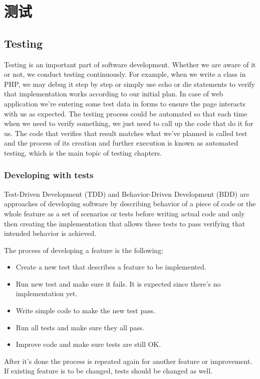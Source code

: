 \chapter{测试}
\label{test-overview.md}\section{Testing}
Testing is an important part of software development. Whether we are aware of it or not, we conduct testing continuously.
For example, when we write a class in PHP, we may debug it step by step or simply use echo or die statements to verify
that implementation works according to our initial plan. In case of web application we're entering some test data in forms
to ensure the page interacts with us as expected. The testing process could be automated so that each time when we need
to verify something, we just need to call up the code that do it for us. The code that verifies that result matches what
we've planned is called test and the process of its creation and further execution is known as automated testing, which
is the main topic of testing chapters.

\subsection{Developing with tests}
Test-Driven Development (TDD) and Behavior-Driven Development (BDD) are approaches of developing
software by describing behavior of a piece of code or the whole feature as a set of scenarios or tests before
writing actual code and only then creating the implementation that allows these tests to pass verifying that intended
behavior is achieved.

The process of developing a feature is the following:

\begin{itemize}
\item Create a new test that describes a feature to be implemented.
\item Run new test and make sure it fails. It is expected since there's no implementation yet.
\item Write simple code to make the new test pass.
\item Run all tests and make sure they all pass.
\item Improve code and make sure tests are still OK.
\end{itemize}
After it's done the process is repeated again for another feature or improvement. If existing feature is to be changed,
tests should be changed as well.

